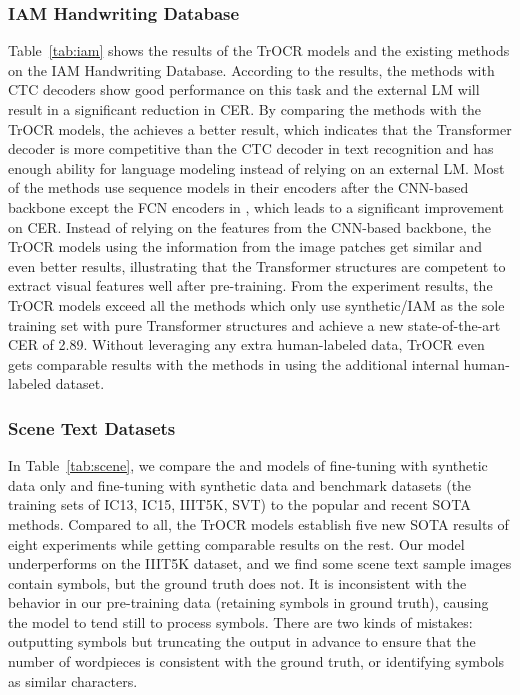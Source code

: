 \documentclass[letterpaper]{article} \usepackage{aaai23}  \usepackage{times}  \usepackage{helvet}  \usepackage{courier}  \usepackage[hyphens]{url}  \usepackage{graphicx} \urlstyle{rm} \def\UrlFont{\rm}  \usepackage{natbib}  \usepackage{caption} \frenchspacing  \setlength{\pdfpagewidth}{8.5in} \setlength{\pdfpageheight}{11in} \usepackage{algorithm}
\begin{document}
\subsubsection{IAM Handwriting Database}
Table~\ref{tab:iam} shows the results of the TrOCR models and the existing methods on the IAM Handwriting Database. According to the results, the methods with CTC decoders show good performance on this task and the external LM will result in a significant reduction in CER. By comparing the methods \cite{bluche2017gated} with the TrOCR models, the  achieves a better result, which indicates that the Transformer decoder is more competitive than the CTC decoder in text recognition and has enough ability for language modeling instead of relying on an external LM.
Most of the methods use sequence models in their encoders after the CNN-based backbone except the FCN encoders in \cite{wang2020decoupled}, which leads to a significant improvement on CER. Instead of relying on the features from the CNN-based backbone, the TrOCR models using the information from the image patches get similar and even better results, illustrating that the Transformer structures are competent to extract visual features well after pre-training. From the experiment results, the TrOCR models exceed all the methods which only use synthetic/IAM as the sole training set with pure Transformer structures and achieve a new state-of-the-art CER of 2.89. Without leveraging any extra human-labeled data, TrOCR even gets comparable results with the methods in \cite{diaz2021rethinking} using the additional internal human-labeled dataset. 

\subsubsection{Scene Text Datasets}
In Table~\ref{tab:scene}, we compare the  and  models of fine-tuning with synthetic data only and fine-tuning with synthetic data and benchmark datasets (the training sets of IC13, IC15, IIIT5K, SVT) to the popular and recent SOTA methods. 
Compared to all, the TrOCR models establish five new SOTA results of eight experiments while getting comparable results on the rest. Our model underperforms on the IIIT5K dataset, and we find some scene text sample images contain symbols, but the ground truth does not. It is inconsistent with the behavior in our pre-training data (retaining symbols in ground truth), causing the model to tend still to process symbols. There are two kinds of mistakes: outputting symbols but truncating the output in advance to ensure that the number of wordpieces is consistent with the ground truth, or identifying symbols as similar characters.
\end{document}
